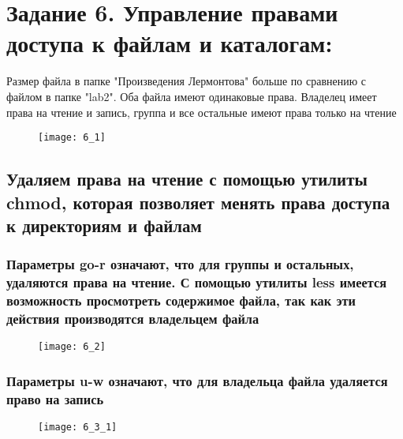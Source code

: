\section{Задание 6. Управление правами доступа к файлам и каталогам:}

Размер файла в папке "Произведения Лермонтова" больше по сравнению с файлом в папке "lab2". Оба файла имеют одинаковые права. Владелец имеет права на чтение и запись, группа и все остальные имеют права только на чтение

\begin{figure}[H]
	\begin{center}
		\texttt{[image: 6\_1]}
		\caption{} 
		\label{pic:pic_1} %
	\end{center}
\end{figure}

\subsection{Удаляем права на чтение с помощью утилиты chmod, которая позволяет менять права доступа к директориям и файлам}

\subsubsection{Параметры go-r означают, что для группы и остальных, удаляются права на чтение. С помощью утилиты less имеется возможность просмотреть содержимое файла, так как эти действия производятся владельцем файла}

\begin{figure}[H]
	\begin{center}
		\texttt{[image: 6\_2]}
		\caption{} 
		\label{pic:pic_1} %
	\end{center}
\end{figure}

\subsubsection{Параметры u-w означают, что для владельца файла удаляется право на запись}

\begin{figure}[H]
	\begin{center}
		\texttt{[image: 6\_3\_1]}
		\caption{} 
		\label{pic:pic_1} %
	\end{center}
\end{figure}

